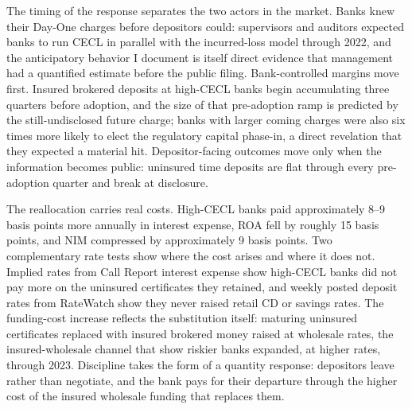 The timing of the response separates the two actors in the market.
Banks knew their Day-One charges before depositors could: supervisors
and auditors expected banks to run CECL in parallel with the
incurred-loss model through 2022, and the anticipatory behavior I
document is itself direct evidence that management had a quantified
estimate before the public filing.  Bank-controlled margins move
first.  Insured brokered deposits at high-CECL banks begin
accumulating three quarters before adoption, and the size of that
pre-adoption ramp is predicted by the still-undisclosed future charge;
banks with larger coming charges were also six times more likely to
elect the regulatory capital phase-in, a direct revelation that they
expected a material hit.  Depositor-facing outcomes move only when the
information becomes public: uninsured time deposits are flat through
every pre-adoption quarter and break at disclosure.

The reallocation carries real costs.  High-CECL banks paid
approximately 8--9 basis points more annually in interest expense, ROA
fell by roughly 15 basis points, and NIM compressed by approximately 9
basis points.  Two complementary rate tests show where the cost arises
and where it does not.  Implied rates from Call Report interest
expense show high-CECL banks did not pay more on the uninsured
certificates they retained, and weekly posted deposit rates from
RateWatch show they never raised retail CD or savings rates.  The
funding-cost increase reflects the substitution itself: maturing
uninsured certificates replaced with insured brokered
money raised at wholesale rates, the insured-wholesale channel that
\citet{huberdeau2025adverse} show riskier banks expanded, at higher
rates, through 2023.  Discipline takes the form of a
quantity response: depositors leave rather than negotiate, and the
bank pays for their departure through the higher cost of the insured
wholesale funding that replaces them.

